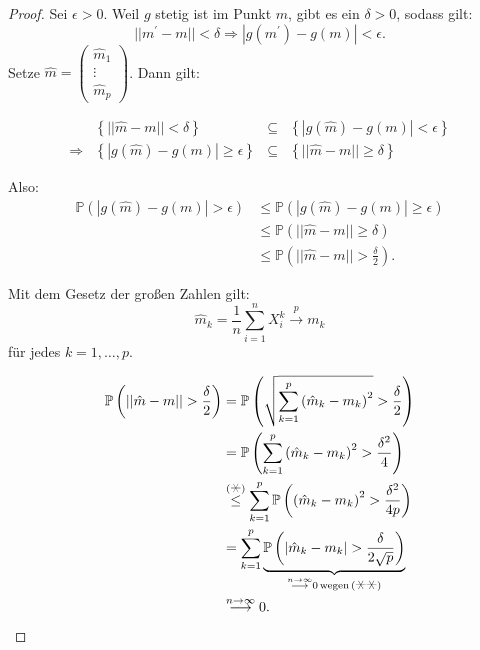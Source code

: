 \documentclass{tstextbook}
\newcommand{\Prob}{\mathbb P}
\begin{document}
\begin{proof}
	Sei $ \epsilon > 0 $. Weil $ g $ stetig ist im Punkt $ m $, gibt es ein $ \delta > 0 $, sodass gilt: 
	\[ ||m^\prime - m|| < \delta \Rightarrow |g(m^\prime) - g(m)| < \epsilon. \]
	Setze $ \hat{m} = \begin{pmatrix}
		\hat{m}_1 \\ \vdots \\ \hat{m}_p
	\end{pmatrix} $. Dann gilt:

	\[
	\begin{aligned}
		\; & \left\lbrace||\hat{m} - m|| < \delta \right\rbrace & \subseteq & \left\lbrace|g(\hat{m}) - g(m)| < \epsilon \right\rbrace \\
		\Rightarrow	& \left\lbrace|g(\hat{m}) - g(m)| \ge \epsilon \right\rbrace & \subseteq & \left\lbrace||\hat{m} - m|| \ge \delta \right\rbrace
	\end{aligned}
	\]
	
	Also: 
	\[
	\begin{aligned}
		\Prob\left(|g(\hat{m})-g(m)|>\epsilon \right) & \le \Prob\left(|g(\hat{m})-g(m)|\ge\epsilon \right) \\
		& \le \Prob\left(||\hat{m}-m||\ge \delta \right) \\
		& \le \Prob\left(||\hat{m}-m||> \frac{\delta}{2} \right).
	\end{aligned}
	\]
	
	Mit dem Gesetz der großen Zahlen gilt: 
	\[
	\hat{m}_k = \frac{1}{n} \sum_{i=1}^{n} X_i^k \overset{p}{\longrightarrow} m_k \tag{$\hexstar\hexstar$}
	\]
	für jedes $ k=1,\ldots, p $. 
	
	\[
	\begin{aligned}
		\Prob\left(||\hat{m}-m||> \frac{\delta}{2} \right) & = \Prob\left(\sqrt{\sum_{k=1}^{p}\left(\hat{m}_k-m_k\right)^2} > \frac{\delta}{2} \right) \\
		& = \Prob\left(\sum_{k=1}^{p}\left(\hat{m}_k-m_k\right)^2 > \frac{\delta^2}{4} \right) \\
		& \overset{(\hexstar)}{\le} \sum_{k=1}^{p} \Prob\left(\left(\hat{m}_k-m_k\right)^2 > \frac{\delta^2}{4p} \right) \\
		& = \sum_{k=1}^{p} \underbrace{\Prob\left(\left|\hat{m}_k-m_k\right| > \frac{\delta}{2\sqrt{p}} \right)}_{\overset{n\to\infty}{\longrightarrow} 0 \, \text{wegen} \, (\hexstar\hexstar)} \\
		& \overset{n\to \infty}{\longrightarrow} 0. 		
	\end{aligned}
	\]
\end{proof}
\end{document}
